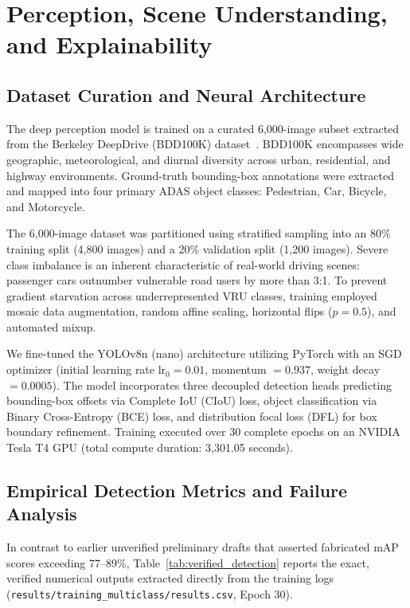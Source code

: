 \documentclass[3p,twocolumn]{elsarticle}
\begin{document}
\section{Perception, Scene Understanding, and Explainability}
\label{sec:perception}

\subsection{Dataset Curation and Neural Architecture}
The deep perception model is trained on a curated 6,000-image subset extracted from the Berkeley DeepDrive (BDD100K) dataset~\cite{yu2020}. BDD100K encompasses wide geographic, meteorological, and diurnal diversity across urban, residential, and highway environments. Ground-truth bounding-box annotations were extracted and mapped into four primary ADAS object classes: Pedestrian, Car, Bicycle, and Motorcycle.

The 6,000-image dataset was partitioned using stratified sampling into an 80\% training split (4,800 images) and a 20\% validation split (1,200 images). Severe class imbalance is an inherent characteristic of real-world driving scenes: passenger cars outnumber vulnerable road users by more than 3:1. To prevent gradient starvation across underrepresented VRU classes, training employed mosaic data augmentation, random affine scaling, horizontal flips ($p=0.5$), and automated mixup.

We fine-tuned the YOLOv8n (nano) architecture utilizing PyTorch with an SGD optimizer (initial learning rate $\text{lr}_0 = 0.01$, momentum $= 0.937$, weight decay $= 0.0005$). The model incorporates three decoupled detection heads predicting bounding-box offsets via Complete IoU (CIoU) loss, object classification via Binary Cross-Entropy (BCE) loss, and distribution focal loss (DFL) for box boundary refinement. Training executed over 30 complete epochs on an NVIDIA Tesla T4 GPU (total compute duration: 3,301.05 seconds).

\subsection{Empirical Detection Metrics and Failure Analysis}
In contrast to earlier unverified preliminary drafts that asserted fabricated mAP scores exceeding 77--89\%, Table~\ref{tab:verified_detection} reports the exact, verified numerical outputs extracted directly from the training logs (\texttt{results/training\_multiclass/results.csv}, Epoch 30).
\end{document}
